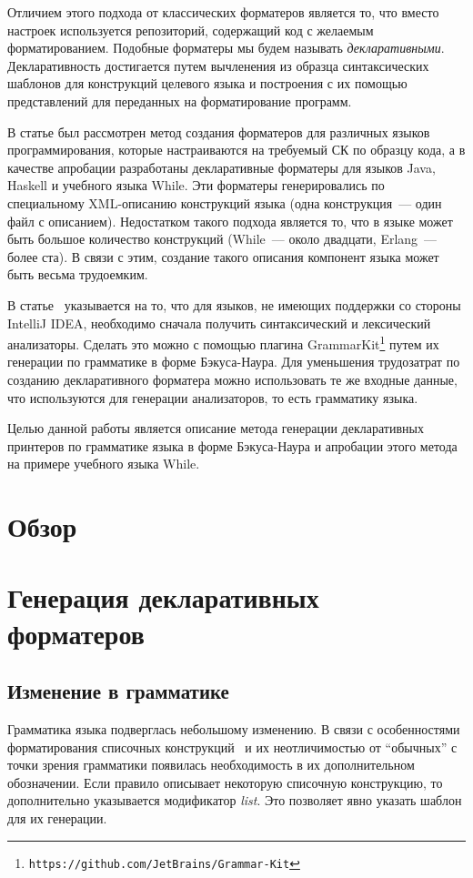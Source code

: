 \documentclass[conference]{IEEEtran}
\begin{document}
Отличием этого подхода от классических форматеров является то, что вместо настроек используется репозиторий, содержащий код с желаемым форматированием.
Подобные форматеры мы будем называть \emph{декларативными}.
Декларативность достигается путем вычленения из образца синтаксических шаблонов для конструкций целевого языка и построения с их помощью представлений для переданных на форматирование программ.

В статье был рассмотрен метод создания форматеров для различных языков программирования, которые настраиваются на требуемый СК по образцу кода, а в качестве апробации разработаны декларативные форматеры для языков Java, Haskell и учебного языка While.
Эти форматеры генерировались по специальному XML-описанию конструкций языка (одна конструкция~--- один файл с описанием). 
Недостатком такого подхода является то, что в языке может быть большое количество конструкций (While~--- около двадцати, Erlang~--- более ста).
В связи с этим, создание такого описания компонент языка может быть весьма трудоемким.

В статье~\cite{while} указывается на то, что для языков, не имеющих поддержки со стороны IntelliJ IDEA, необходимо сначала получить синтаксический и лексический анализаторы.
Сделать это можно с помощью плагина GrammarKit\footnote{\texttt{https://github.com/JetBrains/Grammar-Kit}} путем их генерации по грамматике в форме Бэкуса-Наура.
Для уменьшения трудозатрат по созданию декларативного форматера можно использовать те же входные данные, что используются для генерации анализаторов, то есть грамматику языка.

Целью данной работы является описание метода генерации декларативных принтеров по грамматике языка в форме Бэкуса-Наура и апробации этого метода на примере учебного языка While.


\section{Обзор}


\section{Генерация декларативных форматеров}
\subsection{Изменение в грамматике}
Грамматика языка подверглась небольшому изменению.
В связи с особенностями форматирования списочных конструкций~\cite{while} и их неотличимостью от ``обычных'' с точки зрения грамматики появилась необходимость в их дополнительном обозначении. 
Если правило описывает некоторую списочную конструкцию, то дополнительно указывается модификатор \emph{list}.
Это позволяет явно указать шаблон для их генерации.
\end{document}
